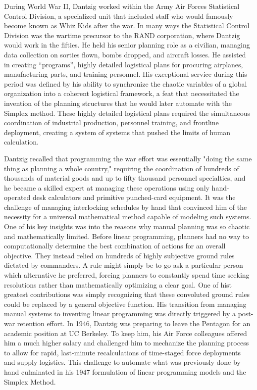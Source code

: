 During World War II, Dantzig worked within the Army Air Forces Statistical Control Division, a specialized unit that included staff who would famously become known as Whiz Kids after the war. In many ways the Statistical Control Division was the wartime precursor to the RAND corporation, where Dantzig would work in the fifties. He held his senior planning role as a civilian, managing data collection on sorties flown, bombs dropped, and aircraft losses. He assisted in creating “programs”, highly detailed logistical plans for procuring airplanes, manufacturing parts, and training personnel. His exceptional service during this period was defined by his ability to synchronize the chaotic variables of a global organization into a coherent logistical framework, a feat that necessitated the invention of the planning structures that he would later automate with the Simplex method. These highly detailed logistical plans required the simultaneous coordination of industrial production, personnel training, and frontline deployment, creating a system of systems that pushed the limits of human calculation. \cite{dantzigReminiscencesOriginsLinear1982} \cite{byrneWhizKidsFounding1993}

Dantzig recalled that programming the war effort was essentially "doing the same thing as planning a whole country," requiring the coordination of hundreds of thousands of material goods and up to fifty thousand personnel specialties, and he became a skilled expert at managing these operations using only hand-operated desk calculators and primitive punched-card equipment. It was the challenge of managing interlocking schedules by hand that convinced him of the necessity for a universal mathematical method capable of modeling such systems. One of his key insights was into the reasons why manual planning was so chaotic and mathematically limited. Before linear programming, planners had no way to computationally determine the best combination of actions for an overall objective. They instead relied on hundreds of highly subjective ground rules dictated by commanders. A rule might simply be to go ask a particular person which alternative he preferred, forcing planners to constantly spend time seeking resolutions rather than mathematically optimizing a clear goal. One of hist greatest contributions was simply recognizing that these convoluted ground rules could be replaced by a general objective function. His transition from managing manual systems to inventing linear programming was directly triggered by a post-war retention effort. In 1946, Dantzig was preparing to leave the Pentagon for an academic position at UC Berkeley. To keep him, his Air Force colleagues offered him a much higher salary and challenged him to mechanize the planning process to allow for rapid, last-minute recalculations of time-staged force deployments and supply logistics. This challenge to automate what was previously done by hand culminated in his 1947 formulation of linear programming models and the Simplex Method. 


